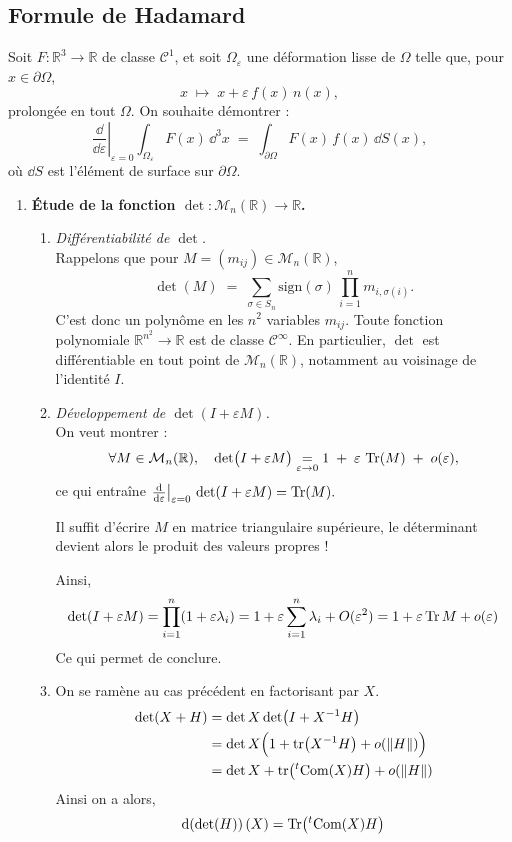 \documentclass[a4paper,10pt]{report}
\newcommand{\RR}{\mathbb{R}}
\begin{document}
		\subsection{Formule de Hadamard}
		Soit \(F : \RR^3 \to \RR\) de classe \(\mathcal{C}^1\), et soit \(\Omega_\varepsilon\) une déformation lisse de \(\Omega\) telle que, pour \(x \in \partial \Omega\),
		\[
		x \;\mapsto\; x + \varepsilon\,f(x)\,n(x),
		\]
		prolongée en tout \(\Omega\). On souhaite démontrer :
		\[
		\left.\frac{\dd}{\dd\varepsilon}\right|_{\varepsilon=0} 
		\int_{\Omega_\varepsilon} F(x)\,\dd^3x 
		\;=\; \int_{\partial \Omega} F(x)\,f(x)\,\dd S(x),
		\tag{4.7.1}\label{eq:Had}
		\]
		où \(\dd S\) est l’élément de surface sur \(\partial \Omega\).
		\begin{enumerate}
			\item \textbf{Étude de la fonction \(\det : \mathcal{M}_n(\RR) \to \RR\).}
			\begin{enumerate}
				\item \emph{Différentiabilité de \(\det\).}\\
				Rappelons que pour \(M = (m_{ij}) \in \mathcal{M}_n(\RR)\),
				\[
				\det(M) \;=\; \sum_{\sigma \in S_n} \text{sign}(\sigma)\,\prod_{i=1}^n m_{i,\sigma(i)}.
				\]
				C’est donc un polynôme en les \(n^2\) variables \(m_{ij}\). Toute fonction polynomiale \(\RR^{n^2}\to\RR\) est de classe \( \mathcal{C}^\infty\). En particulier, \(\det\) est différentiable en tout point de \(\mathcal{M}_n(\RR)\), notamment au voisinage de l’identité \(I\).
				
				\item \emph{Développement de \(\det(I + \varepsilon M)\).}\\
				On veut montrer :
				\[
				\forall M\in\mathcal{M}_n(\RR),\quad
				\det\bigl(I + \varepsilon M\bigr) 
				\underset{\varepsilon\to0}{=} 1 \;+\; \varepsilon\,\Tr(M) \;+\; o(\varepsilon),
				\]
				ce qui entraîne 
				\(\bigl.\frac{\dd}{\dd\varepsilon}\bigr|_{\varepsilon=0}\,\det(I + \varepsilon M) = \Tr(M).\)
				
			Il suffit d'écrire $M$ en matrice triangulaire supérieure, le déterminant devient alors le produit des valeurs propres !
			
			Ainsi,
			$$\det(I + \varepsilon M) = \prod_{i=1}^n (1+\varepsilon \lambda_i) = 1 + \varepsilon \sum_{i=1}^n \lambda_i + O(\varepsilon^2) = 1+\varepsilon \Tr M + o(\varepsilon)$$
			Ce qui permet de conclure.
			\item On se ramène au cas précédent en factorisant par $X$.
			\begin{align*}
				\det(X+H) &= \det X \det(I + X^{-1}H)\\
				 &= \det X \Bigl(1 + \tr(X^{-1}H) + o(\norm{H})\Bigr)\\
				  &= \det X + \tr(^t\text{Com}(X) H) + o(\norm{H})
			\end{align*}
			Ainsi on a alors,
			$$\dd(\det(H))(X) = \Tr(^t\text{Com}(X) H)$$
			\end{enumerate}
			

\end{enumerate}
\end{document}
